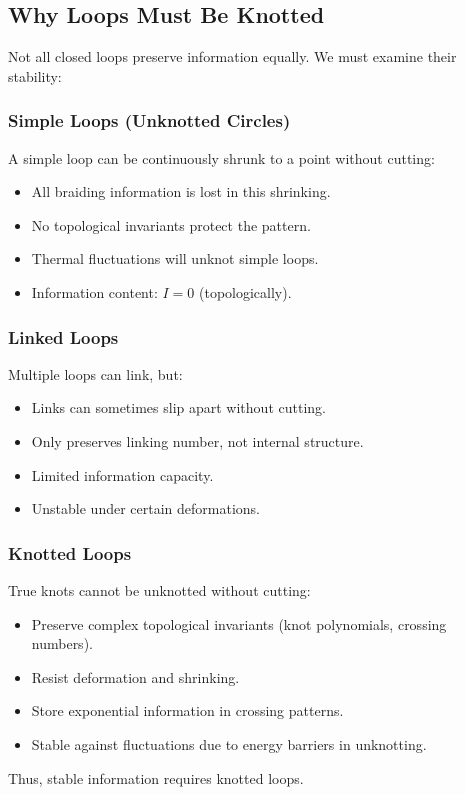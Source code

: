 \documentclass{article}
\begin{document}
\subsection{Why Loops Must Be Knotted}
Not all closed loops preserve information equally. We must examine their stability:

\subsubsection{Simple Loops (Unknotted Circles)}
A simple loop can be continuously shrunk to a point without cutting:
\begin{itemize}
\item All braiding information is lost in this shrinking.
\item No topological invariants protect the pattern.
\item Thermal fluctuations will unknot simple loops.
\item Information content: $I=0$ (topologically).
\end{itemize}

\subsubsection{Linked Loops}
Multiple loops can link, but:
\begin{itemize}
\item Links can sometimes slip apart without cutting.
\item Only preserves linking number, not internal structure.
\item Limited information capacity.
\item Unstable under certain deformations.
\end{itemize}

\subsubsection{Knotted Loops}
True knots cannot be unknotted without cutting:
\begin{itemize}
\item Preserve complex topological invariants (knot polynomials, crossing numbers).
\item Resist deformation and shrinking.
\item Store exponential information in crossing patterns.
\item Stable against fluctuations due to energy barriers in unknotting.
\end{itemize}
Thus, stable information requires knotted loops.
\end{document}
